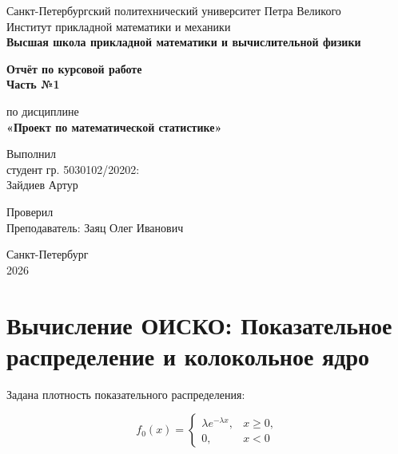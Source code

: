 \documentclass[12pt,a4paper]{article}
\begin{document}


\begin{titlepage}
  \begin{center}
    {Санкт-Петербургский политехнический университет Петра Великого\\
    Институт прикладной математики и механики\\[0.5em]
    \textbf{Высшая школа прикладной математики и вычислительной физики}}

    \vfill

    {\LARGE\bfseries Отчёт по курсовой работе\\ Часть №1\par}
    \vspace{1em}
    {\Large по дисциплине\\[0.3em]
    {\bfseries «Проект по математической статистике»}}

    \vfill

    \begin{flushright}
        Выполнил\\
        студент гр. 5030102/20202:\\
        Зайдиев Артур
    \end{flushright}

    \begin{flushright}
        Проверил\\
        Преподаватель: Заяц Олег Иванович
    \end{flushright}

    \vfill
    Санкт-Петербург\\
    2026
  \end{center}
\end{titlepage}

\setcounter{page}{2}
\newpage


\section*{Вычисление ОИСКО: Показательное распределение и колокольное ядро}

Задана плотность показательного распределения:

\[
f_0(x)=
\begin{cases}
\lambda e^{-\lambda x}, & x \ge 0,\\
0, & x<0
\end{cases}
\]
\end{document}
